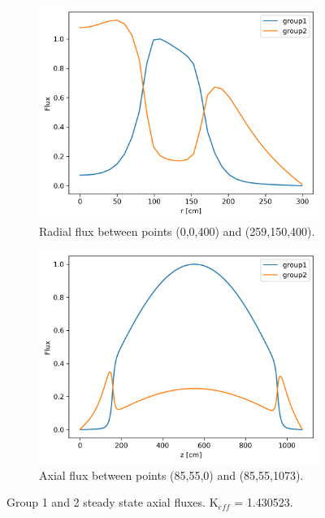 \documentclass[11pt,letterpaper]{article}
\begin{document}
	\begin{figure}[htbp!]
		\centering
		\begin{subfigure}[t]{0.4\textwidth}
			\centering
			\includegraphics[width=\linewidth]{3D-fullcore-60-radial1}
			\caption{Radial flux between points (0,0,400) and (259,150,400).}
		\end{subfigure}
		\begin{subfigure}[t]{0.4\textwidth}
			\centering
			\includegraphics[width=\linewidth]{3D-fullcore-60-axial1}
			\caption{Axial flux between points (85,55,0) and (85,55,1073).}
		\end{subfigure}
		\hfill
		\caption{Group 1 and 2 steady state axial fluxes. K$_{eff}$ = 1.430523.}
		\label{fig:3D-fullcore-60-homo1}
	\end{figure}
\end{document}
